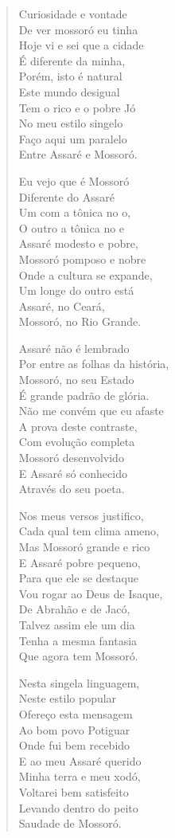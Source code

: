 \begin{verse}
Curiosidade e vontade\\
De ver mossoró eu tinha\\
Hoje vi e sei que a cidade\\
É diferente da minha,\\
Porém, isto é natural\\
Este mundo desigual\\
Tem o rico e o pobre Jó\\
No meu estilo singelo\\
Faço aqui um paralelo\\
Entre Assaré e Mossoró.

Eu vejo que é Mossoró\\
Diferente do Assaré\\
Um com a tônica no o,\\
O outro a tônica no e\\
Assaré modesto e pobre,\\
Mossoró pomposo e nobre\\
Onde a cultura se expande,\\
Um longe do outro está\\
Assaré, no Ceará,\\
Mossoró, no Rio Grande.

Assaré não é lembrado\\
Por entre as folhas da história,\\
Mossoró, no seu Estado\\
É grande padrão de glória.\\
Não me convém que eu afaste\\
A prova deste contraste,\\
Com evolução completa\\
Mossoró desenvolvido\\
E Assaré só conhecido\\
Através do seu poeta.

Nos meus versos justifico,\\
Cada qual tem clima ameno,\\
Mas Mossoró grande e rico\\
E Assaré pobre pequeno,\\
Para que ele se destaque\\
Vou rogar ao Deus de Isaque,\\
De Abrahão e de Jacó,\\
Talvez assim ele um dia\\
Tenha a mesma fantasia\\
Que agora tem Mossoró.

Nesta singela linguagem,\\
Neste estilo popular\\
Ofereço esta mensagem\\
Ao bom povo Potiguar\\
Onde fui bem recebido\\
E ao meu Assaré querido\\
Minha terra e meu xodó,\\
Voltarei bem satisfeito\\
Levando dentro do peito\\
Saudade de Mossoró.
\end{verse}

